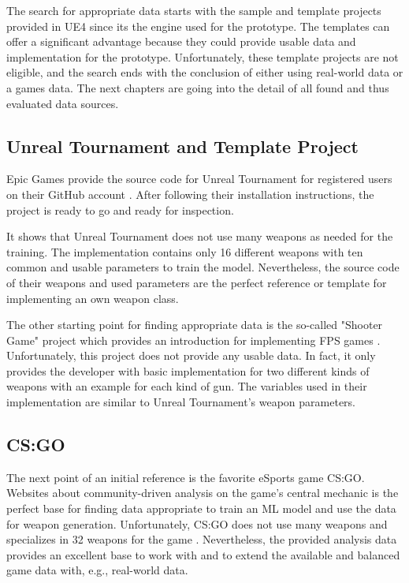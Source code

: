 \documentclass[MGS,Master,english]{twbook}%
\begin{document}
The search for appropriate data starts with the sample and template projects provided in UE4 since its the engine used for the prototype. The templates can offer a significant advantage because they could provide usable data and implementation for the prototype. Unfortunately, these template projects are not eligible, and the search ends with the conclusion of either using real-world data or a games data. The next chapters are going into the detail of all found and thus evaluated data sources.

\subsection{Unreal Tournament and Template Project}
Epic Games provide the source code for Unreal Tournament for registered users on their GitHub account \cite{epicGames::unrealTournamentSourceCode}. After following their installation instructions, the project is ready to go and ready for inspection.

It shows that Unreal Tournament does not use many weapons as needed for the training. The implementation contains only 16 different weapons with ten common and usable parameters to train the model. Nevertheless, the source code of their weapons and used parameters are the perfect reference or template for implementing an own weapon class.

The other starting point for finding appropriate data is the so-called "Shooter Game" project which provides an introduction for implementing FPS games \cite{epicGames::shooterGame}. Unfortunately, this project does not provide any usable data. In fact, it only provides the developer with basic implementation for two different kinds of weapons with an example for each kind of gun. The variables used in their implementation are similar to Unreal Tournament’s weapon parameters.

\subsection{\acl{CS:GO}}
The next point of an initial reference is the favorite eSports game \ac{CS:GO}. Websites about community-driven analysis on the game's central mechanic is the perfect base for finding data appropriate to train an ML model and use the data for weapon generation. Unfortunately, CS:GO does not use many weapons and specializes in 32 weapons for the game \cite{counterstrike::wikiWeapons}. Nevertheless, the provided analysis data provides an excellent base to work with and to extend the available and balanced game data with, e.g., real-world data.
\end{document}
